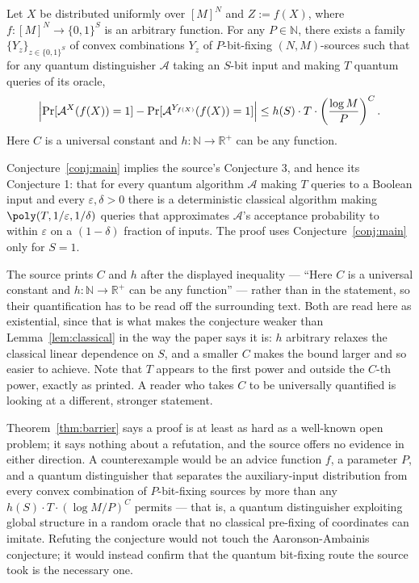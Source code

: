 \documentclass{conjura-conjecture}
\newcommand{\Adv}{\mathcal{A}}
\newcommand{\Prb}{\Pr}
\newcommand{\bits}{\{0,1\}}
\begin{document}
\begin{conjecture}\label{conj:main}
Let $X$ be distributed uniformly over $[M]^{N}$ and $Z := f(X)$, where
$f : [M]^{N} \to \bits^{S}$ is an arbitrary function. For any $P \in
\mathbb{N}$, there exists a family $\{Y_{z}\}_{z \in \bits^{S}}$ of
convex combinations $Y_{z}$ of $P$-bit-fixing $(N,M)$-sources such that
for any quantum distinguisher $\Adv$ taking an $S$-bit input and making
$T$ quantum queries of its oracle,
\[
  \Bigl|\Prb[\Adv^{X}(f(X)) = 1]
  - \Prb[\Adv^{Y_{f(X)}}(f(X)) = 1]\Bigr|
  \le h(S) \cdot T \cdot \left(\frac{\log M}{P}\right)^{C}.
\]
Here $C$ is a universal constant and $h : \mathbb{N} \to \mathbb{R}^{+}$
can be any function.
\end{conjecture}

\begin{theorem}\label{thm:barrier}
Conjecture~\ref{conj:main} implies the source's Conjecture 3, and hence
its Conjecture 1: that for every quantum algorithm $\Adv$ making $T$
queries to a Boolean input and every $\varepsilon, \delta > 0$ there is
a deterministic classical algorithm making $\poly(T, 1/\varepsilon,
1/\delta)$ queries that approximates $\Adv$'s acceptance probability to
within $\varepsilon$ on a $(1-\delta)$ fraction of inputs. The proof
uses Conjecture~\ref{conj:main} only for $S = 1$.
\end{theorem}

\begin{remark}\label{rem:quantifiers}
The source prints $C$ and $h$ after the displayed inequality --- ``Here
$C$ is a universal constant and $h : \mathbb{N} \to \mathbb{R}^{+}$ can
be any function'' --- rather than in the statement, so their
quantification has to be read off the surrounding text. Both are read
here as existential, since that is what makes the conjecture weaker
than Lemma~\ref{lem:classical} in the way the paper says it is: $h$
arbitrary relaxes the classical linear dependence on $S$, and a smaller
$C$ makes the bound larger and so easier to achieve. Note that $T$
appears to the first power and outside the $C$-th power, exactly as
printed. A reader who takes $C$ to be universally quantified is looking
at a different, stronger statement.
\end{remark}

\begin{remark}\label{rem:refutation}
Theorem~\ref{thm:barrier} says a proof is at least as hard as a
well-known open problem; it says nothing about a refutation, and the
source offers no evidence in either direction. A counterexample would be
an advice function $f$, a parameter $P$, and a quantum distinguisher
that separates the auxiliary-input distribution from every convex
combination of $P$-bit-fixing sources by more than any $h(S) \cdot T
\cdot (\log M / P)^{C}$ permits --- that is, a quantum distinguisher
exploiting global structure in a random oracle that no classical
pre-fixing of coordinates can imitate. Refuting the conjecture would
not touch the Aaronson-Ambainis conjecture; it would instead confirm
that the quantum bit-fixing route the source took is the necessary one.
\end{remark}
\end{document}
